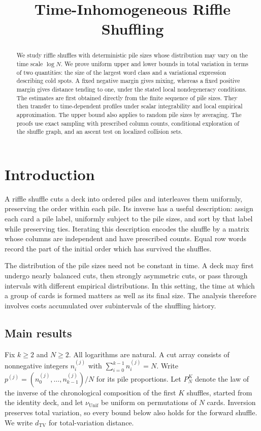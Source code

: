 \documentclass[11pt]{article}
\title{Time-Inhomogeneous Riffle Shuffling}
\author{}
\date{}
\makeatletter
\numberwithin{equation}{section}
\theoremstyle{definition}
\theoremstyle{remark}
\newcommand{\TV}{\mathrm{TV}}
\newcommand{\Unif}{\mathrm{Unif}}
\newcommand{\dTV}{d_{\TV}}
\newcommand{\nuUnif}{\nu_{\Unif}}
\newcommand{\1}{\mathbf 1}
\renewcommand{\maketitle}{\begin{center}{\LARGE\@title\par}\end{center}\vspace{1em}}
\makeatother
\begin{document}
\maketitle
\begin{abstract}
We study riffle shuffles with deterministic pile sizes whose distribution may
vary on the time scale $\log N$. We prove uniform upper and lower bounds in
total variation in terms of two quantities: the size of the largest word
class and a variational expression describing cold spots. A fixed negative
margin gives mixing, whereas a fixed positive margin gives distance tending
to one, under the stated local nondegeneracy conditions. The estimates are
first obtained directly from the finite sequence of pile sizes. They then
transfer to time-dependent profiles under scalar integrability and local
empirical approximation. The upper bound also applies to random pile sizes
by averaging. The proofs use exact sampling with prescribed column counts,
conditional exploration of the shuffle graph, and an ascent test on
localized collision sets.
\end{abstract}

\section{Introduction}

A riffle shuffle cuts a deck into ordered piles and interleaves them
uniformly, preserving the order within each pile. Its inverse has a useful
description: assign each card a pile label, uniformly subject to the pile
sizes, and sort by that label while preserving ties. Iterating this
description encodes the shuffle by a matrix whose columns are independent
and have prescribed counts. Equal row words record the part of the initial
order which has survived the shuffles.

The distribution of the pile sizes need not be constant in time. A deck may
first undergo nearly balanced cuts, then strongly asymmetric cuts, or pass
through intervals with different empirical distributions. In this setting,
the time at which a group of cards is formed matters as well as its final
size. The analysis therefore involves costs accumulated over subintervals
of the shuffling history.

\subsection{Main results}

Fix $k\ge2$ and $N\ge2$. All logarithms are natural. A cut array
consists of nonnegative integers $n_i^{(j)}$ with
$\sum_{i=0}^{k-1}n_i^{(j)}=N$. Write
$p^{(j)}=(n_0^{(j)},\ldots,n_{k-1}^{(j)})/N$ for its pile proportions.
Let $P_N^K$ denote the law of the inverse of the chronological
composition of the first $K$ shuffles, started from the identity deck,
and let $\nuUnif$ be uniform on permutations of $N$ cards.
Inversion preserves total variation, so every bound below also holds
for the forward shuffle. We write $\dTV$ for total-variation distance.
\end{document}
